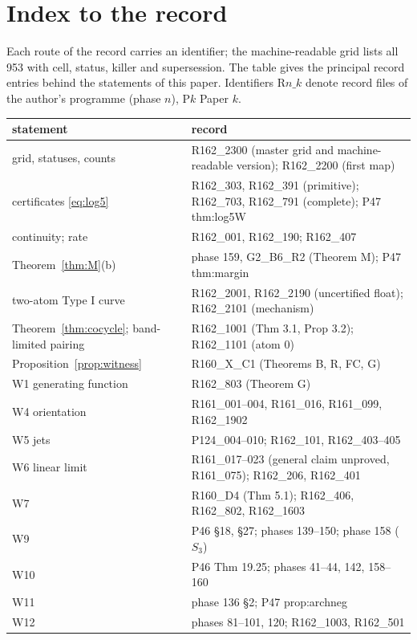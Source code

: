 \documentclass[11pt]{amsart}
\theoremstyle{definition}
\theoremstyle{remark}
\begin{document}
\appendix
\section{Index to the record}\label{app:index}

Each route of the record carries an identifier; the machine-readable grid lists all 953 with cell, status,
killer and supersession. The table gives the principal record entries behind the statements of this paper.
Identifiers $\mathrm{R}n\_k$ denote record files of the author's programme (phase $n$), $\mathrm Pk$ Paper $k$.

\begin{center}\small
\begin{tabularx}{\textwidth}{@{}p{5.2cm}Y@{}}
\toprule
statement & record \\
\midrule
grid, statuses, counts & R162\_2300 (master grid and machine-readable version); R162\_2200 (first map) \\
certificates \eqref{eq:log5} & R162\_303, R162\_391 (primitive); R162\_703, R162\_791 (complete); P47 thm:log5W \\
continuity; rate & R162\_001, R162\_190; R162\_407 \\
Theorem~\ref{thm:M}(b) & phase 159, G2\_B6\_R2 (Theorem M); P47 thm:margin \\
two-atom Type I curve & R162\_2001, R162\_2190 (uncertified float); R162\_2101 (mechanism) \\
Theorem~\ref{thm:cocycle}; band-limited pairing & R162\_1001 (Thm 3.1, Prop 3.2); R162\_1101 (atom 0) \\
Proposition~\ref{prop:witness} & R160\_X\_C1 (Theorems B, R, FC, G) \\
W1 generating function & R162\_803 (Theorem G) \\
W4 orientation & R161\_001--004, R161\_016, R161\_099, R162\_1902 \\
W5 jets & P124\_004--010; R162\_101, R162\_403--405 \\
W6 linear limit & R161\_017--023 (general claim unproved, R161\_075); R162\_206, R162\_401 \\
W7 & R160\_D4 (Thm 5.1); R162\_406, R162\_802, R162\_1603 \\
W9 & P46 \S18, \S27; phases 139--150; phase 158 ($S_3$) \\
W10 & P46 Thm 19.25; phases 41--44, 142, 158--160 \\
W11 & phase 136 \S2; P47 prop:archneg \\
W12 & phases 81--101, 120; R162\_1003, R162\_501 \\

\end{tabularx}
\end{center}
\end{document}
